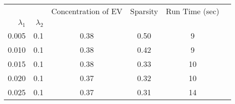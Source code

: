 \begin{tabular}{rr|cccc}
\toprule
      &     &  Concentration of EV &  Sparsity & Run Time (sec) \\
$\lambda_1$ & $\lambda_2$ &                      &           &                \\
\midrule
0.005 & 0.1 &                 0.38 &      0.50 &              9 \\
0.010 & 0.1 &                 0.38 &      0.42 &              9 \\
0.015 & 0.1 &                 0.38 &      0.33 &             10 \\
0.020 & 0.1 &                 0.37 &      0.32 &             10 \\
0.025 & 0.1 &                 0.37 &      0.31 &             14 \\
\bottomrule
\end{tabular}
